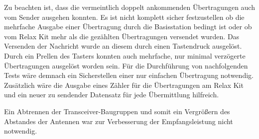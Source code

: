 Zu beachten ist, dass die vermeintlich doppelt ankommenden Übertragungen auch vom Sender ausgehen konnten. Es ist nicht komplett sicher festzustellen ob die mehrfache Ausgabe einer Übertragung durch die Basisstation  bedingt ist oder ob vom Relax Kit mehr als die gezählten Übertragungen versendet wurden. Das Versenden der Nachricht wurde an diesem durch einen Tastendruck ausgelöst.  Durch ein Prellen des Tasters konnten auch mehrfache, nur minimal verzögerte Übertragungen ausgelöst worden sein.
Für die Durchführung von nachfolgenden Tests wäre demnach ein Sicherstellen einer nur einfachen Übertragung notwendig. Zusätzlich wäre die Ausgabe eines Zähler für die Übertragungen am Relax Kit und ein neuer zu sendender Datensatz für jede Übermittlung hilfreich.

Ein Abtrennen der Transceiver-Baugruppen und somit ein Vergrößern des Abstandes der Antennen war zur Verbesserung der Empfangsleistung nicht notwendig.